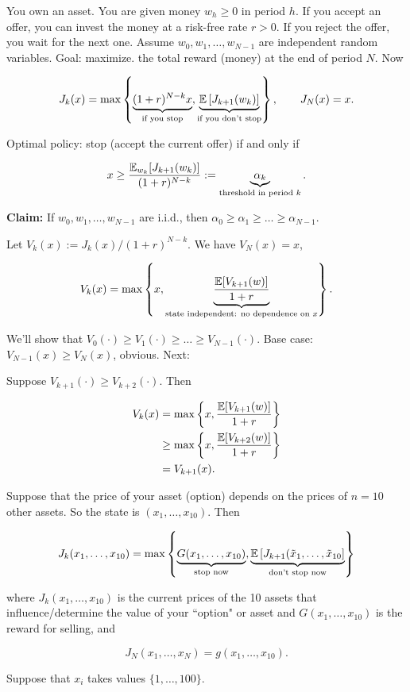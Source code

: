 \begin{example}

You own an asset. You are given money \(w_h \geq 0\) in period \(h\). If you accept an offer, you can invest the money at a risk-free rate \(r > 0\). If you reject the offer, you wait for the next one. Assume \(w_0, w_1, \ldots, w_{N-1}\) are independent random variables. Goal: maximize. the total reward (money) at the end of period \(N\).  Now

\[
J_k(x) = \max\left\{ \underbrace{(1+r)^{N-k} x }_{\text{if you stop}} , \underbrace{\mathbb{E} \left[ J_{k+1}(w_k) \right] }_{\text{if you don't stop}} \right\}, \qquad J_N(x) =x.
\]

Optimal policy: stop (accept the current offer) if and only if 

\[
x \geq \frac{\mathbb{E}_{w_k}[J_{k+1}(w_k)]}{(1 + r)^{N-k}} := \underbrace{\alpha_k}_{\text{threshold in period }k}.
\]

\textbf{Claim:} If \(w_0, w_1, \ldots, w_{N-1}\) are i.i.d., then \(\alpha_0 \geq \alpha_1 \geq \ldots \geq \alpha_{N -1}\). 

Let \(V_k(x) := J_k(x)/(1 + r)^{N-k}\). We have \(V_N(x) = x\), 

\[
V_k(x) = \max \left \{x,  \underbrace{\frac{ \mathbb{E}[V_{k+1}(w)] }{1 + r}}_{\text{state independent: no dependence on } x} \right\}.
\]

We'll show that \(V_0(\cdot) \geq V_1(\cdot) \geq \ldots \geq V_{N-1}(\cdot)\). Base case: \(V_{N-1}(x) \geq V_N(x)\), obvious. Next:

Suppose \(V_{k+1}(\cdot) \geq V_{k+2}(\cdot)\). Then 

\begin{align*}
V_k(x) & =  \max \left\{x,  \frac{ \mathbb{E}[V_{k+1}(w)] }{1 + r} \right\}
\\ & \geq \max \left\{x,  \frac{ \mathbb{E}[V_{k+2}(w)] }{1 + r} \right\}
\\ & = V_{k+1}(x).
\end{align*}

\end{example}

\begin{example}

Suppose that the price of your asset (option) depends on the prices of \(n = 10\) other assets. So the state is \((x_1, \ldots, x_{10})\). Then

\[
J_k(x_1, \ldots, x_{10}) =  \max\left\{ \underbrace{G(x_1, \ldots, x_{10}) }_{\text{stop now}},   \underbrace{\mathbb{E} \left[ J_{k+1}(\tilde{x}_1, \ldots, \tilde{x}_{10}\right] }_{\text{don't stop now}}\right\}
\]

where \(J_k(x_1, \ldots, x_{10}) \) is the current prices of the 10 assets that influence/determine the value of your ``option" or asset and \(G(x_1, \ldots, x_{10})\) is the reward for selling, and

\[
J_N(x_1, \ldots, x_N) = g(x_1,  \ldots, x_{10}).
\]

Suppose that \(x_i\) takes values \(\{1, \ldots, 100\}\). 

\end{example}

